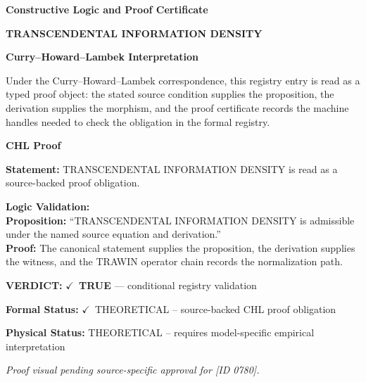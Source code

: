 \clearpage
\begingroup\tzpsupportsetup
\noindent\textbf{\fontsize{10.8pt}{12.8pt}\selectfont [ID 0780] Constructive Logic and Proof Certificate}\par
\noindent\textbf{\fontsize{10pt}{12pt}\selectfont TRANSCENDENTAL INFORMATION DENSITY}\par
\vspace{0.45em}
\begingroup
\footnotesize
\setlength{\parskip}{0.22em}
\setlength{\parindent}{0pt}
\noindent\textbf{Curry--Howard--Lambek Interpretation}\par
Under the Curry--Howard--Lambek correspondence, this registry entry is read as a typed proof
object: the stated source condition supplies the proposition, the derivation supplies the
morphism, and the proof certificate records the machine handles needed to check the obligation
in the formal registry.

\vspace{0.45em}
\noindent\textbf{CHL Proof}\par
\textbf{Statement:} TRANSCENDENTAL INFORMATION DENSITY is read as a source-backed proof obligation.

\textbf{Logic Validation:}\\
\textbf{Proposition:} ``TRANSCENDENTAL INFORMATION DENSITY is admissible under the named source equation and derivation.''\\
\textbf{Proof:} The canonical statement supplies the proposition, the derivation supplies the witness, and the TRAWIN operator chain records the normalization path.

\textbf{VERDICT:} \ensuremath{\checkmark}\ \textbf{TRUE} --- conditional registry validation

\textbf{Formal Status:} \ensuremath{\checkmark}\ THEORETICAL -- source-backed CHL proof obligation

\textbf{Physical Status:} THEORETICAL -- requires model-specific empirical interpretation
\par\vspace{0.45em}
\par
\vfill
\begingroup\footnotesize\itshape
Proof visual pending source-specific approval for [ID 0780].
\par\endgroup
\vfill
\endgroup
\endgroup
